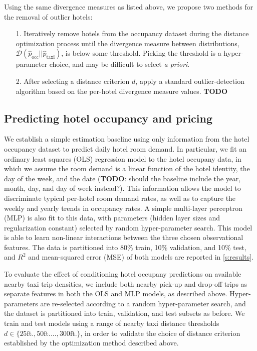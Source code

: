 \documentclass[useAMS, referee, usenatbib]{biom}
\begin{document}
Using the same divergence measures as listed above, we propose two methods for the removal of outlier hotels:

\begin{itemize}

\item [1.] Iteratively remove hotels from the occupancy dataset during the distance optimization process until the divergence measure between distributions, $\mathcal{D} (\hat{p}_{\mathrm{occ}} || \hat{p}_{\mathrm{taxi}})$, is below some threshold. Picking the threshold is a hyper-parameter choice, and may be difficult to select \textit{a priori}.

\item [2.] After selecting a distance criterion $d$, apply a standard outlier-detection algorithm based on the per-hotel divergence measure values. \textbf{TODO}

\end{itemize}

\subsection{Predicting hotel occupancy and pricing}

We establish a simple estimation baseline using only information from the hotel occupancy dataset to predict daily hotel room demand. In particular, we fit an ordinary least squares (OLS) regression model to the hotel occupany data, in which we assume the room demand is a linear function of the hotel identity, the day of the week, and the date (\textbf{TODO}: should the baseline include the year, month, day, and day of week instead?). This information allows the model to discriminate typical per-hotel room demand rates, as well as to capture the weekly and yearly trends in occupancy rates. A simple multi-layer perceptron (MLP) is also fit to this data, with parameters (hidden layer sizes and regularization constant) selected by random hyper-parameter search. This model is able to learn non-linear interactions between the three chosen observational features. The data is partitioned into 80\% train, 10\% validation, and 10\% test, and $R^2$ and mean-squared error (MSE) of both models are reported in \ref{s:results}.

To evaluate the effect of conditioning hotel occupany predictions on available nearby taxi trip densities, we include both nearby pick-up and drop-off trips as separate features in both the OLS and MLP models, as described above. Hyper-parameters are re-selected according to a random hyper-parameter search, and the dataset is partitioned into train, validation, and test subsets as before. We train and test models using a range of nearby taxi distance thresholds $d \in \{25 \mathrm{ft.}, 50 \mathrm{ft.} ..., 300 \mathrm{ft.} \}$, in order to validate the choice of distance criterion established by the optimization method described above.
\end{document}
